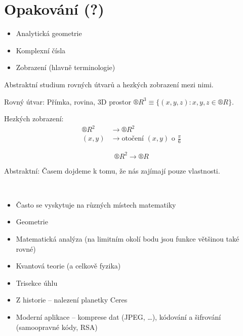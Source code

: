 \documentclass[12pt]{article}					%
\begin{document}
\section{Opakování (?)}
    \begin{itemize}
        \item Analytická geometrie
        \item Komplexní čísla
        \item Zobrazení (hlavně terminologie)
    \end{itemize}
    \begin{poznamka}
        Abstraktní studium rovných útvarů a hezkých zobrazení mezi nimi.

        Rovný útvar: Přímka, rovina, 3D prostor $®R^3 \equiv \{(x, y, z): x, y, z \in ®R\}$.

        Hezkých zobrazení: 
        \begin{align}
            ®R^2 & \longrightarrow ®R^2 \\
            (x, y) & \longrightarrow \text{otočení }(x, y)\text{ o }\frac{\pi}{6}
        \end{align}

        $$ ®R^2 \longrightarrow ®R $$

        Abstraktní: Časem dojdeme k tomu, že nás zajímají pouze vlastnosti.
    \end{poznamka}
    \begin{poznamka}
        \ 
        \begin{itemize}
            \item Často se vyskytuje na různých místech matematiky
            \item Geometrie
            \item Matematická analýza (na limitním okolí bodu jsou funkce většinou také rovné)
            \item Kvantová teorie (a celkově fyzika)
            \item Trisekce úhlu
            \item Z historie -- nalezení planetky Ceres
            \item Moderní aplikace -- komprese dat (JPEG, …), kódování a šifrování (samoopravné kódy, RSA)
        \end{itemize}
        
    \end{poznamka}
\end{document}

